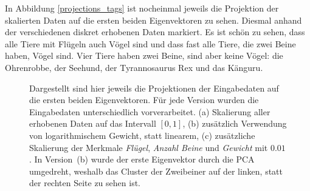  In Abbildung \ref{projections_tags} ist nocheinmal jeweils die Projektion der skalierten Daten auf die ersten beiden Eigenvektoren zu sehen. Diesmal anhand der verschiedenen diskret erhobenen Daten markiert. Es ist \zb schön zu sehen, dass alle Tiere mit Flügeln auch Vögel sind und dass fast alle Tiere, die zwei Beine haben, Vögel sind. Vier Tiere haben zwei Beine, sind aber keine Vögel: die Ohrenrobbe, der Seehund, der Tyrannosaurus Rex und das Känguru.

 \begin{figure}
  \qquad
  \qquad
  
  \caption{Dargestellt sind hier jeweils die Projektionen der Eingabedaten auf die ersten beiden Eigenvektoren. Für jede Version wurden die Eingabedaten unterschiedlich vorverarbeitet. (a) Skalierung aller erhobenen Daten auf das Intervall $[0, 1]$, (b) zusätzlich Verwendung von logarithmischem Gewicht, statt linearem, (c) zusätzliche Skalierung der Merkmale \emph{Flügel}, \emph{Anzahl Beine} und \emph{Gewicht} mit $0.01$. In \mbox{Version (b)} wurde der erste Eigenvektor durch die PCA umgedreht, weshalb das Cluster der Zweibeiner auf der linken, statt der rechten Seite zu sehen ist.}
  \label{projections_scales}
 \end{figure}
 
